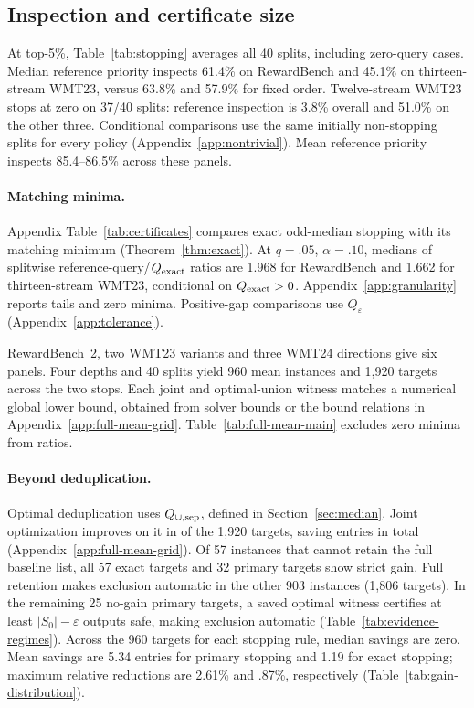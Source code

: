\documentclass[11pt]{article}
\begin{document}
\subsection{Inspection and certificate size}

At top-5\%, Table~\ref{tab:stopping} averages all 40 splits, including zero-query cases. Median reference priority inspects 61.4\% on RewardBench and 45.1\% on thirteen-stream WMT23, versus 63.8\% and 57.9\% for fixed order. Twelve-stream WMT23 stops at zero on 37/40 splits: reference inspection is 3.8\% overall and 51.0\% on the other three. Conditional comparisons use the same initially non-stopping splits for every policy (Appendix~\ref{app:nontrivial}). Mean reference priority inspects 85.4--86.5\% across these panels.


\paragraph{Matching minima.} Appendix Table~\ref{tab:certificates} compares exact odd-median stopping with its matching minimum (Theorem~\ref{thm:exact}). At $q=.05$, $\alpha=.10$, medians of splitwise reference-query/$Q_{\rm exact}$ ratios are 1.968 for RewardBench and 1.662 for thirteen-stream WMT23, conditional on $Q_{\rm exact}>0$. Appendix~\ref{app:granularity} reports tails and zero minima. Positive-gap comparisons use $Q_\varepsilon$ (Appendix~\ref{app:tolerance}).

RewardBench~2, two WMT23 variants and three WMT24 directions give six panels. Four depths and 40 splits yield 960 mean instances and 1,920 targets across the two stops. Each joint and optimal-union witness matches a numerical global lower bound, obtained from solver bounds or the bound relations in Appendix~\ref{app:full-mean-grid}. Table~\ref{tab:full-mean-main} excludes zero minima from ratios. \paragraph{Beyond deduplication.} Optimal deduplication uses $Q_{\cup,\rm sep}$, defined in Section~\ref{sec:median}. Joint optimization improves on it in \fullMeanStrictGain{} of the 1,920 targets, saving \fullMeanJointSaving{} entries in total (Appendix~\ref{app:full-mean-grid}). Of 57 instances that cannot retain the full baseline list, all 57 exact targets and 32 primary targets show strict gain. Full retention makes exclusion automatic in the other 903 instances (1,806 targets). In the remaining 25 no-gain primary targets, a saved optimal witness certifies at least $|S_0|-\varepsilon$ outputs safe, making exclusion automatic (Table~\ref{tab:evidence-regimes}). Across the 960 targets for each stopping rule, median savings are zero. Mean savings are 5.34 entries for primary stopping and 1.19 for exact stopping; maximum relative reductions are 2.61\% and .87\%, respectively (Table~\ref{tab:gain-distribution}).
\end{document}
